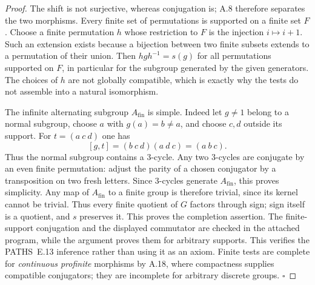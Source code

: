 \begin{proof}
The shift is not surjective, whereas conjugation is; A.8 therefore separates the two morphisms. Every finite set of permutations is supported on a finite set $F$. Choose a finite permutation $h$ whose restriction to $F$ is the injection $i\mapsto i+1$. Such an extension exists because a bijection between two finite subsets extends to a permutation of their union. Then $hgh^{-1}=s(g)$ for all permutations supported on $F$, in particular for the subgroup generated by the given generators. The choices of $h$ are not globally compatible, which is exactly why the tests do not assemble into a natural isomorphism.

The infinite alternating subgroup $A_{\mathrm{fin}}$ is simple. Indeed let $g\ne1$ belong to a normal subgroup, choose $a$ with $g(a)=b\ne a$, and choose $c,d$ outside its support. For $t=(a\ c\ d)$ one has
\[
 [g,t]=(b\ c\ d)(a\ d\ c)=(a\ b\ c).
\]
Thus the normal subgroup contains a $3$-cycle. Any two $3$-cycles are conjugate by an even finite permutation: adjust the parity of a chosen conjugator by a transposition on two fresh letters. Since $3$-cycles generate $A_{\mathrm{fin}}$, this proves simplicity. Any map of $A_{\mathrm{fin}}$ to a finite group is therefore trivial, since its kernel cannot be trivial. Thus every finite quotient of $G$ factors through sign; sign itself is a quotient, and $s$ preserves it. This proves the completion assertion. The finite-support conjugation and the displayed commutator are checked in the attached program, while the argument proves them for arbitrary supports. This verifies the PATHS~E.13 inference rather than using it as an axiom. Finite tests are complete for \emph{continuous profinite} morphisms by A.18, where compactness supplies compatible conjugators; they are incomplete for arbitrary discrete groups. \hfill$\square$
\end{proof}

